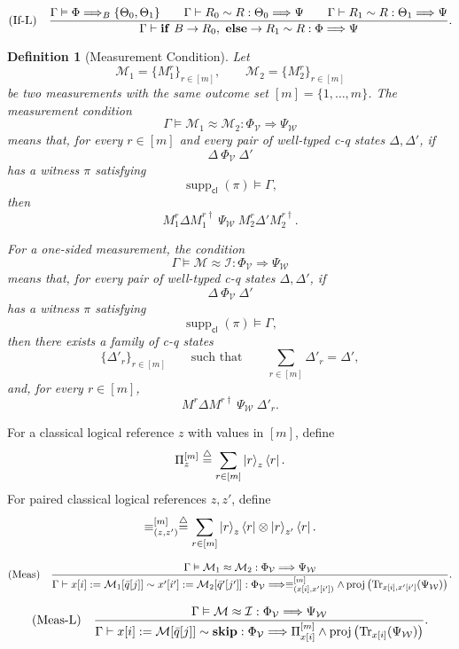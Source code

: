 \documentclass[acmsmall,screen,review,anonymous,nonacm]{acmart}
\newtheorem{definition}{Definition}[section]
\theoremstyle{defn_style}
\begin{document}
\[
\text{\rm (If-L)}
\quad
\frac{
\Gamma
\vDash
\Phi\Longrightarrow_B\{\Theta_0,\Theta_1\}
\qquad
\Gamma
\vdash
R_0\sim R:
\Theta_0\Longrightarrow\Psi
\qquad
\Gamma
\vdash
R_1\sim R:
\Theta_1\Longrightarrow\Psi
}{
\Gamma
\vdash
\mathbf{if}\ B\rightarrow R_0,\ \mathbf{else}\rightarrow R_1
\sim
R
:
\Phi
\Longrightarrow
\Psi
}.
\]


\begin{definition}[Measurement Condition]
Let
\[
\mathcal M_1=\{M_1^{r}\}_{r\in[m]},
\qquad
\mathcal M_2=\{M_2^{r}\}_{r\in[m]}
\]
be two measurements with the same outcome set
\([m]=\{1,\ldots,m\}\). The measurement condition
\[
\Gamma
\vDash
\mathcal M_1\approx\mathcal M_2:
\Phi_{\mathcal V}
\Longrightarrow
\Psi_{\mathcal W}
\]
means that, for every \(r\in[m]\) and every pair of well-typed
c-q states \(\Delta,\Delta'\), if
\[
\Delta\ \Phi_{\mathcal V}\ \Delta'
\]
has a witness \(\pi\) satisfying
\[
\operatorname{supp}_{\mathsf{cl}}(\pi)\models\Gamma,
\]
then
\[
M_1^r\Delta M_1^{r\dagger}
\ \Psi_{\mathcal W}\
M_2^r\Delta'M_2^{r\dagger}.
\]

For a one-sided measurement, the condition
\[
\Gamma
\vDash
\mathcal M\approx\mathcal I:
\Phi_{\mathcal V}
\Longrightarrow
\Psi_{\mathcal W}
\]
means that, for every pair of well-typed c-q states
\(\Delta,\Delta'\), if
\[
\Delta\ \Phi_{\mathcal V}\ \Delta'
\]
has a witness \(\pi\) satisfying
\[
\operatorname{supp}_{\mathsf{cl}}(\pi)\models\Gamma,
\]
then there exists a family of c-q states
\[
\{\Delta'_r\}_{r\in[m]}
\qquad\text{such that}\qquad
\sum_{r\in[m]}\Delta'_r=\Delta',
\]
and, for every \(r\in[m]\),
\[
M^r\Delta M^{r\dagger}
\ \Psi_{\mathcal W}\
\Delta'_r.
\]
\end{definition}

For a classical logical reference \(z\) with values in \([m]\), define
\[
\Pi_z^{[m]}
\stackrel{\triangle}{=}
\sum_{r\in[m]}
\ket r_z\bra r .
\]
For paired classical logical references \(z,z'\), define
\[
\equiv^{[m]}_{(z,z')}
\stackrel{\triangle}{=}
\sum_{r\in[m]}
\ket r_z\bra r
\otimes
\ket r_{z'}\bra r .
\]

\[
\text{\rm (Meas)}
\quad
\frac{
\Gamma
\vDash
\mathcal M_1\approx\mathcal M_2:
\Phi_{\mathcal V}
\Longrightarrow
\Psi_{\mathcal W}
}{
\Gamma
\vdash
x[i]:=\mathcal M_1[\bar q[j]]
\sim
x'[i']:=\mathcal M_2[\bar q'[j']]
:
\Phi_{\mathcal V}
\Longrightarrow
\equiv^{[m]}_{(x[i],x'[i'])}
\land
\operatorname{proj}
\left(
\operatorname{Tr}_{x[i],x'[i']}(\Psi_{\mathcal W})
\right)
}.
\]

\[
\text{\rm (Meas-L)}
\quad
\frac{
\Gamma
\vDash
\mathcal M\approx\mathcal I:
\Phi_{\mathcal V}
\Longrightarrow
\Psi_{\mathcal W}
}{
\Gamma
\vdash
x[i]:=\mathcal M[\bar q[j]]
\sim
\mathbf{skip}
:
\Phi_{\mathcal V}
\Longrightarrow
\Pi^{[m]}_{x[i]}
\land
\operatorname{proj}
\left(
\operatorname{Tr}_{x[i]}(\Psi_{\mathcal W})
\right)
}.
\]
\end{document}
